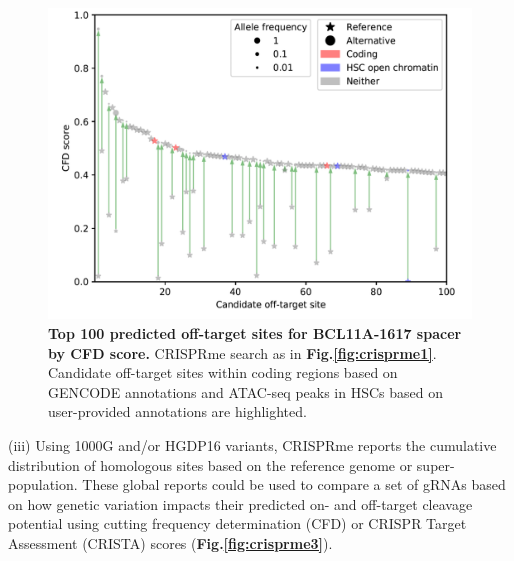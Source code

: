 \documentclass[a4paper, titlepage, openright]{book}
\begin{document}
\begin{figure}
	\centering
	\includegraphics[width=\textwidth]{figures/crisprme2.png}
	\caption[Top 100 predicted off-target sites for BCL11A-1617 spacer by CFD score]{\textbf{Top 100 predicted off-target sites for BCL11A-1617 spacer by CFD score.} CRISPRme search as in \textbf{Fig.\ref{fig:crisprme1}}. Candidate off-target sites within coding regions based on GENCODE annotations and ATAC-seq peaks in HSCs based on user-provided annotations are highlighted.}
	\label{fig:crisprme2}
\end{figure} 
(iii) Using 1000G and/or HGDP16 variants, CRISPRme reports the cumulative distribution of homologous sites based on the reference genome or super-population. These global reports could be used to compare a set of gRNAs based on how genetic variation impacts their predicted on- and off-target cleavage potential using cutting frequency determination (CFD) or CRISPR Target Assessment (CRISTA) \citep{abadi2017machine} scores (\textbf{Fig.\ref{fig:crisprme3}}). 
\end{document}
